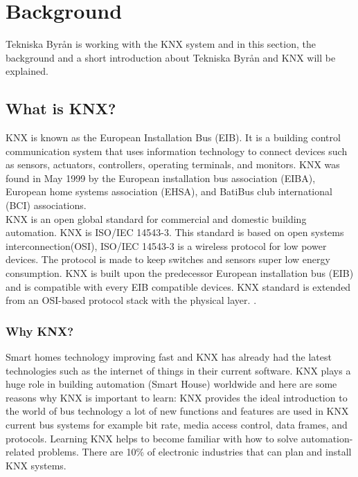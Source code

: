 \documentclass{article}
\begin{document}
\section{Background}
Tekniska Byrån is working with the KNX system and in this section, the background and a short introduction about Tekniska Byrån and KNX will be explained.
\subsection{What is KNX?}
KNX is known as the European Installation Bus (EIB). It is a building control communication system that uses information technology to connect devices such as sensors, actuators, controllers, operating terminals, and monitors. 
KNX was found in May 1999 by the European installation bus association (EIBA), European home systems association (EHSA), and BatiBus club international (BCI) associations.\cite{KNXLegacy}\cite{Automation} \\

KNX is an open global standard for commercial and domestic building automation. KNX is ISO/IEC
14543-3. This standard is based on open systems interconnection(OSI)\cite{alma991000857549505936}, ISO/IEC 14543-3 is a
wireless protocol for low power devices. The protocol is made to keep switches and sensors super
low energy consumption. KNX is built upon the predecessor European installation bus
(EIB) and is compatible with every EIB compatible devices.   
KNX standard is extended from an OSI-based protocol stack with the physical layer. \cite{iso}\cite{Automation}.
 \subsubsection{Why KNX?}
 Smart homes technology improving fast and KNX has already had the latest technologies such as the internet of things in their current software. KNX plays a huge role in building automation (Smart House) worldwide and here are some reasons why KNX is important to learn: 
KNX provides the ideal introduction to the world of bus technology a lot of new functions and features are used in KNX current bus systems for example bit rate, media access control, data frames, and protocols. Learning KNX helps to become familiar with how to solve automation-related problems. There are 10\% of electronic industries that can plan and install KNX systems.\cite{KNXBenefits}\cite{Automation} \\
\end{document}
